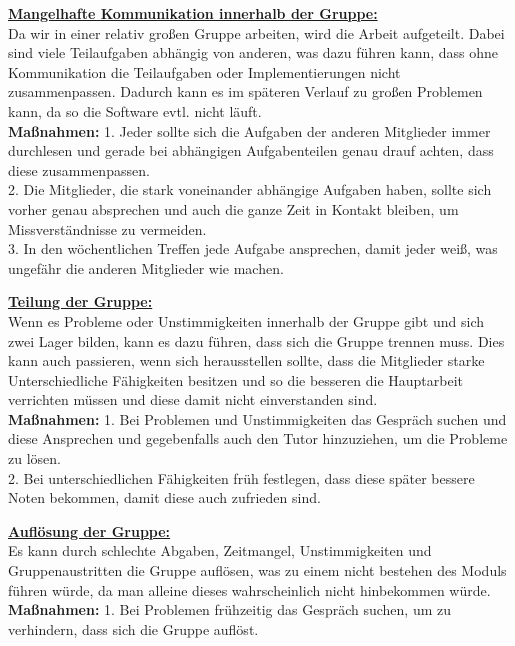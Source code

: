 \documentclass[fontsize=12pt,paper=a4,twoside]{scrartcl}
\begin{document}
\textbf{\underline{Mangelhafte Kommunikation innerhalb der Gruppe:}}\\
Da wir in einer relativ großen Gruppe arbeiten, wird die Arbeit aufgeteilt. Dabei sind viele Teilaufgaben abhängig von anderen, was dazu führen kann, dass ohne Kommunikation die Teilaufgaben oder Implementierungen nicht zusammenpassen. Dadurch kann es im späteren Verlauf zu großen Problemen kann, da so die Software evtl. nicht läuft.\\
\textbf{Maßnahmen:}
1. Jeder sollte sich die Aufgaben der anderen Mitglieder immer durchlesen und gerade bei abhängigen Aufgabenteilen genau drauf achten, dass diese zusammenpassen.\\
2. Die Mitglieder, die stark voneinander abhängige Aufgaben haben, sollte sich vorher genau absprechen und auch die ganze Zeit in Kontakt bleiben, um Missverständnisse zu vermeiden.\\
3. In den wöchentlichen Treffen jede Aufgabe ansprechen, damit jeder weiß, was ungefähr die anderen Mitglieder wie machen.\\

\bigskip

\textbf{\underline{Teilung der Gruppe:}}\\
Wenn es Probleme oder Unstimmigkeiten innerhalb der Gruppe gibt und sich zwei Lager bilden, kann es dazu führen, dass sich die Gruppe trennen muss. Dies kann auch passieren, wenn sich herausstellen sollte, dass die Mitglieder starke Unterschiedliche Fähigkeiten besitzen und so die besseren die Hauptarbeit verrichten müssen und diese damit nicht einverstanden sind.\\
\textbf{Maßnahmen:}
1. Bei Problemen und Unstimmigkeiten das Gespräch suchen und diese Ansprechen und gegebenfalls auch den Tutor hinzuziehen, um die Probleme zu lösen.\\
2. Bei unterschiedlichen Fähigkeiten früh festlegen, dass diese später bessere Noten bekommen, damit diese auch zufrieden sind.\\

\bigskip

\textbf{\underline{Auflösung der Gruppe:}}\\
Es kann durch schlechte Abgaben, Zeitmangel, Unstimmigkeiten und Gruppenaustritten die Gruppe auflösen, was zu einem nicht bestehen des Moduls führen würde, da man alleine dieses wahrscheinlich nicht hinbekommen würde. \\
\textbf{Maßnahmen:}
1. Bei Problemen frühzeitig das Gespräch suchen, um zu verhindern, dass sich die Gruppe auflöst.\\
\end{document}
